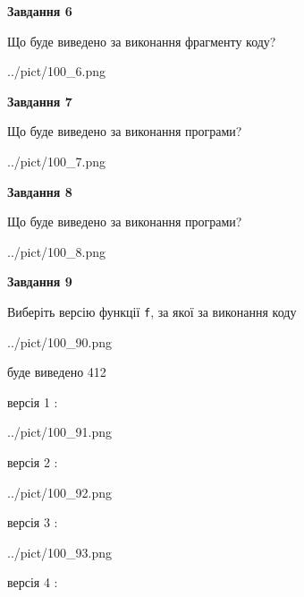 \documentclass[12pt, ukrainian]{article}
\def\code#1{\Verb!#1!}
\begin{document}
{\begin {large}
{\begin {center}\textbf{Завдання 6}\end {center}}

Що буде виведено за виконання фрагменту коду?\par
\begin{center}
	{../pict/100_6.png}
\end{center}
\newpage

{\begin {center}\textbf{Завдання 7}\end {center}}

Що буде виведено за виконання програми?\par
\begin{center}
	{../pict/100_7.png}
\end{center}
\newpage

{\begin {center}\textbf{Завдання 8}\end {center}}

Що буде виведено за виконання програми?\par
\begin{center}
	{../pict/100_8.png}
\end{center}
\newpage

{\begin {center}\textbf{Завдання 9}\end {center}}

Виберіть версію функції \code{f}, за якої за виконання коду
\begin{center}
	{../pict/100_90.png}
\end{center}
буде виведено 412

\vspace{5mm}
версія 1 :

\begin{center}
	{../pict/100_91.png}
\end{center}
версія 2 :

\begin{center}
	{../pict/100_92.png}
\end{center}
версія 3 :

\begin{center}
	{../pict/100_93.png}
\end{center}
версія 4 :


\end{large}}
\end{document}
